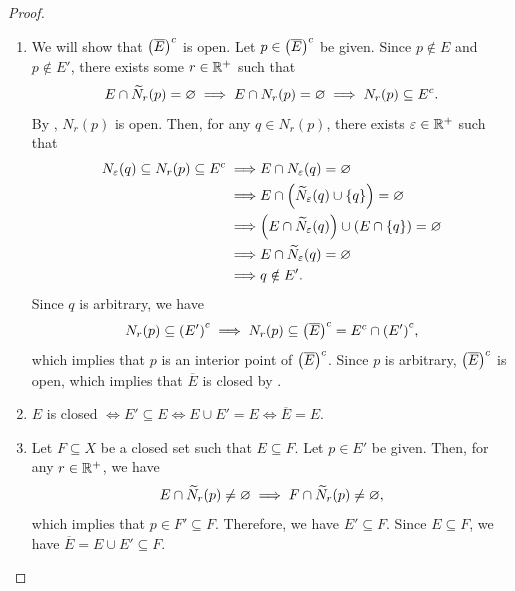 \begin{proof}
    \begin{enumerate}[label=\textbf{(\Alph*)}]
        \item We will show that $\paren*{\overline{E}}^{c}$ is open. Let $p \in \paren*{\overline{E}}^{c}$ be given.
        Since $p \notin E$ and $p \notin E'$, there exists some $r \in \R^{+}$ such that
        \[
        E \cap \widetilde{N}_{r}(p) = \vnot \implies E \cap N_{r}(p) = \vnot \implies N_{r}(p) \subseteq E^{c}.
        \]
        By , $N_{r}(p)$ is open. Then, for any $q \in N_{r}(p)$,
        there exists $\veps \in \R^{+}$ such that
        \begin{align*}
            N_{\veps}(q) \subseteq N_{r}(p) \subseteq E^{c}
            \implies &E \cap N_{\veps}(q) = \vnot \\
            \implies &E \cap \paren*{\widetilde{N}_{\veps}(q) \cup \set*{q}} = \vnot \\ 
            \implies &\paren*{E \cap \widetilde{N}_{\veps}(q)} \cup \paren*{E \cap \set*{q}} = \vnot \\
            \implies &E \cap \widetilde{N}_{\veps}(q) = \vnot \\
            \implies &q \notin E'.
        \end{align*}
        Since $q$ is arbitrary, we have
        \[
        N_{r}(p) \subseteq \paren*{E'}^{c} \implies N_{r}(p) \subseteq
        \paren*{\overline{E}}^{c} = E^{c} \cap \paren*{E'}^{c},
        \]
        which implies that $p$ is an interior point of $\paren*{\overline{E}}^{c}$. Since $p$ is arbitrary, $\paren*{
        \overline{E}}^{c}$ is open, which implies that $\overline{E}$ is closed by .
        \item $E$ is closed $\iff E' \subseteq E \iff E \cup E' = E \iff \overline{E} = E$.
        \item Let $F \subseteq X$ be a closed set such that $E \subseteq F$. Let $p \in E'$ be given.
        Then, for any $r \in \R^{+}$, we have
        \[
        E \cap \widetilde{N}_{r}(p) \neq \vnot \implies F \cap \widetilde{N}_{r}(p) \neq \vnot,
        \]
        which implies that $p \in F' \subseteq F$. Therefore, we have $E' \subseteq F$.
        Since $E \subseteq F$, we have $\overline{E} = E \cup E' \subseteq F$.
    \end{enumerate}
\end{proof}

\bigskip

